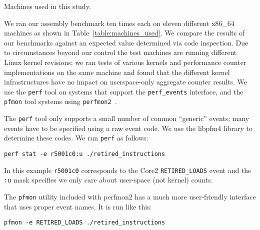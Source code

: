 \begin{table}[!t]
\renewcommand{\arraystretch}{1.3}
\caption{Machines used in this study.  
}
\label{table:machines_used}
\centering

\end{table}

We ran our assembly benchmark ten times each on eleven different x86\_64 
machines as shown in Table~\ref{table:machines_used}.
We compare the results of our benchmarks against an expected value 
determined via code inspection.  
Due to circumstances beyond our control the test machines are 
running different Linux kernel revisions;
we ran tests of 
various kernels and performance counter implementations on the same machine
and found that the different kernel infrastructures
have no impact on userspace-only aggregate counter results.
We use the {\tt perf} tool on systems that support the {\tt perf\_events}
interface, and the {\tt pfmon}
tool systems using {\tt perfmon2}~\cite{eranian:ols06}.

The {\tt perf} tool only supports a small number of common ``generic'' 
events; many events have to be specified using a
raw event code.  We use the libpfm4 library to determine these codes.
We run {\tt perf} as follows:

\begin{footnotesize}
{\tt perf stat -e r5001c0:u ./retired\_instructions}
\end{footnotesize}

\noindent
In this example {\tt r5001c0} corresponds to the Core2 
{\tt RETIRED\_LOADS} event
and the {\tt :u} mask specifies
we only care about user-space (not kernel) counts.

The {\tt pfmon} utility included with perfmon2
has a much more user-friendly interface that uses proper event names.
It is run like this:

\begin{footnotesize}
{\tt pfmon -e RETIRED\_LOADS ./retired\_instructions}
\end{footnotesize}


